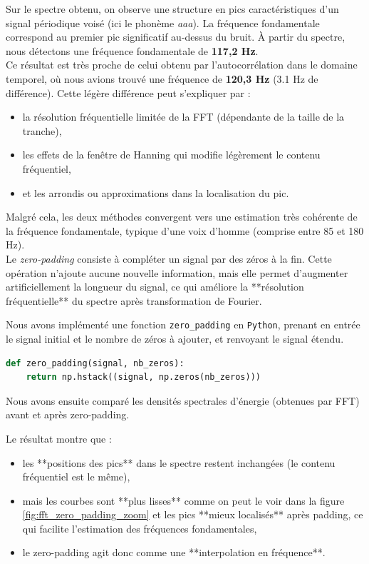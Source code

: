 Sur le spectre obtenu, on observe une structure en pics caractéristiques d’un signal périodique voisé (ici le phonème \textit{aaa}). La fréquence fondamentale correspond au premier pic significatif au-dessus du bruit. À partir du spectre, nous détectons une fréquence fondamentale de \textbf{117{,}2 Hz}.\\

Ce résultat est très proche de celui obtenu par l’autocorrélation dans le domaine temporel, où nous avions trouvé une fréquence de \textbf{120{,}3 Hz} (3.1 Hz de différence). Cette légère différence peut s’expliquer par :
\begin{itemize}
    \item la résolution fréquentielle limitée de la FFT (dépendante de la taille de la tranche),
    \item les effets de la fenêtre de Hanning qui modifie légèrement le contenu fréquentiel,
    \item et les arrondis ou approximations dans la localisation du pic.
\end{itemize}
Malgré cela, les deux méthodes convergent vers une estimation très cohérente de la fréquence fondamentale, typique d’une voix d’homme (comprise entre 85 et 180 Hz).\\

Le \emph{zero-padding} consiste à compléter un signal par des zéros à la fin. Cette opération n’ajoute aucune nouvelle information, mais elle permet d’augmenter artificiellement la longueur du signal, ce qui améliore la **résolution fréquentielle** du spectre après transformation de Fourier.

Nous avons implémenté une fonction \texttt{zero\_padding} en \texttt{Python}, prenant en entrée le signal initial et le nombre de zéros à ajouter, et renvoyant le signal étendu.

\begin{lstlisting}[language=Python]
    def zero_padding(signal, nb_zeros):
    return np.hstack((signal, np.zeros(nb_zeros)))
\end{lstlisting}

Nous avons ensuite comparé les densités spectrales d’énergie (obtenues par FFT) avant et après zero-padding.

Le résultat montre que :
\begin{itemize}
  \item les **positions des pics** dans le spectre restent inchangées (le contenu fréquentiel est le même),
  \item mais les courbes sont **plus lisses** comme on peut le voir dans la figure \ref{fig:fft_zero_padding_zoom} et les pics **mieux localisés** après padding, ce qui facilite l’estimation des fréquences fondamentales,
  \item le zero-padding agit donc comme une **interpolation en fréquence**.
\end{itemize}

